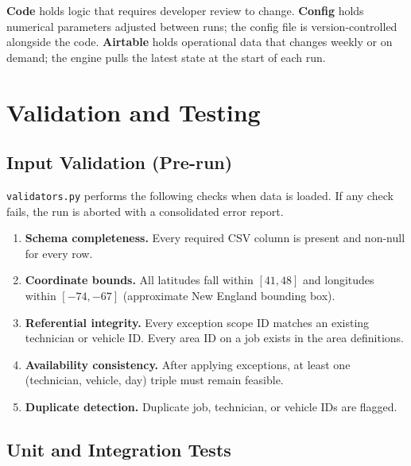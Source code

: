 \documentclass[12pt]{article}
\begin{document}
\textbf{Code} holds logic that requires developer review to change.
\textbf{Config} holds numerical parameters adjusted between runs; the config file is version-controlled alongside the code.
\textbf{Airtable} holds operational data that changes weekly or on demand; the engine pulls the latest state at the start of each run.

\section*{Validation and Testing}
\label{sec:validation}

\subsection*{Input Validation (Pre-run)}

\texttt{validators.py} performs the following checks when data is loaded.  If any check fails, the run is aborted with a consolidated error report.

\begin{enumerate}
    \item \textbf{Schema completeness.} Every required CSV column is present and non-null for every row.
    \item \textbf{Coordinate bounds.} All latitudes fall within $[41, 48]$ and longitudes within $[-74, -67]$ (approximate New England bounding box).
    \item \textbf{Referential integrity.} Every exception scope ID matches an existing technician or vehicle ID.  Every area ID on a job exists in the area definitions.
    \item \textbf{Availability consistency.} After applying exceptions, at least one (technician, vehicle, day) triple must remain feasible.
    \item \textbf{Duplicate detection.} Duplicate job, technician, or vehicle IDs are flagged.
\end{enumerate}


\subsection*{Unit and Integration Tests}
\end{document}
